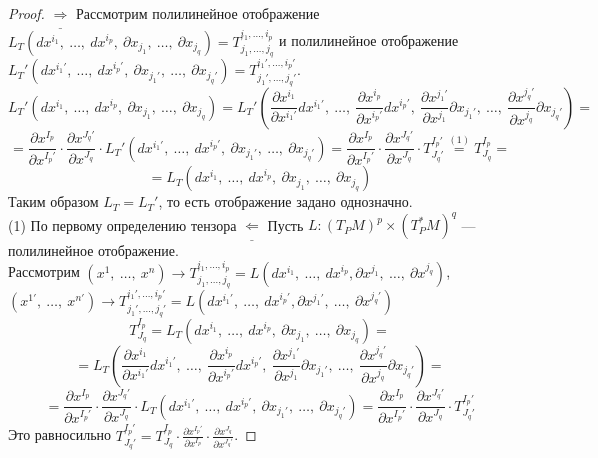 \documentclass[12pt]{article}
\theoremstyle{plain}
\begin{document}
    \begin{proof}
        $\underline{\Longrightarrow}$ Рассмотрим полилинейное отображение\\
        $L_T(dx^{i_1}, \ \ldots, \ dx^{i_p}, \ \partial x_{j_1}, \ \ldots, \ \partial x_{j_q})=T^{i_1,\ldots,i_p}_{j_1,\ldots,j_q}$ и полилинейное отображение\\
        $L_T'(dx^{i_1'}, \ \ldots, \ dx^{i_p'}, \ \partial x_{j_1'}, \ \ldots, \ \partial x_{j_q'})=T^{i_1',\ldots,i_p'}_{j_1',\ldots,j_q'}$.
        $$L_T'(dx^{i_1}, \ \ldots, \ dx^{i_p}, \ \partial x_{j_1}, \ \ldots, \ \partial x_{j_q})=L_T'\left(\frac{\partial x^{i_1}}{\partial x^{i_1'}}dx^{i_1'}, \ \ldots, \ \frac{\partial x^{i_p}}{\partial x^{i_p'}}dx^{i_p'}, \ \frac{\partial x^{j_1'}}{\partial x^{j_1}}\partial x_{j_1'}, \ \ldots, \ \frac{\partial x^{j_q'}}{\partial x^{j_q}}\partial x_{j_q'}\right)=$$
        $$=\frac{\partial x^{I_p}}{\partial x^{I_p'}}\cdot\frac{\partial x^{J_q'}}{\partial x^{J_q}}\cdot L_T'(dx^{i_1'}, \ \ldots, \ dx^{i_p'}, \ \partial x_{j_1'}, \ \ldots, \ \partial x_{j_q'})=\frac{\partial x^{I_p}}{\partial x^{I_p'}}\cdot\frac{\partial x^{J_q'}}{\partial x^{J_q}}\cdot T_{J_q'}^{I_p'}\overset{(1)}{=}T_{J_q}^{I_p}=$$
        $$=L_T(dx^{i_1}, \ \ldots, \ dx^{i_p}, \ \partial x_{j_1}, \ \ldots, \ \partial x_{j_q})$$
        Таким образом $L_T=L_T'$, то есть отображение задано однозначно.\\
        (1) По первому определению тензора
        $\underline{\Longleftarrow}$ Пусть $L:\left(T_PM\right)^p\times\left(T_P^*M\right)^q$ --- полилинейное отображение.\\
        Рассмотрим $(x^{1}, \ \ldots, \ x^{n})\longrightarrow T^{i_1,\ldots,i_p}_{j_1,\ldots,j_q}=L(dx^{i_1}, \ \ldots, \ dx^{i_p}, \partial x^{j_1}, \ \ldots, \ \partial x^{j_q})$,\\$(x^{1'}, \ \ldots, \ x^{n'})\longrightarrow T^{i_1',\ldots,i_p'}_{j_1',\ldots,j_q'}=L(dx^{i_1'}, \ \ldots, \ dx^{i_p'}, \partial x^{j_1'}, \ \ldots, \ \partial x^{j_q'})$
        $$T^{I_p}_{J_q}=L_T(dx^{i_1}, \ \ldots, \ dx^{i_p}, \ \partial x_{j_1}, \ \ldots, \ \partial x_{j_q})=$$
        $$=L_T\left(\frac{\partial x^{i_1}}{\partial x^{i_1'}}dx^{i_1'}, \ \ldots, \ \frac{\partial x^{i_p}}{\partial x^{i_p'}}dx^{i_p'}, \ \frac{\partial x^{j_1'}}{\partial x^{j_1}}\partial x_{j_1'}, \ \ldots, \ \frac{\partial x^{j_q'}}{\partial x^{j_q}}\partial x_{j_q'}\right)=$$
        $$=\frac{\partial x^{I_p}}{\partial x^{I_p'}}\cdot\frac{\partial x^{J_q'}}{\partial x^{J_q}}\cdot L_T(dx^{i_1'}, \ \ldots, \ dx^{i_p'}, \ \partial x_{j_1'}, \ \ldots, \ \partial x_{j_q'})=\frac{\partial x^{I_p}}{\partial x^{I_p'}}\cdot\frac{\partial x^{J_q'}}{\partial x^{J_q}}\cdot T_{J_q'}^{I_p'}$$
        Это равносильно $T_{J_q'}^{I_p'}= T_{J_q}^{I_p}\cdot\frac{\partial x^{I_p'}}{\partial x^{I_p}}\cdot\frac{\partial x^{J_q}}{\partial x^{J_q'}}$.
    \end{proof}
\end{document}
